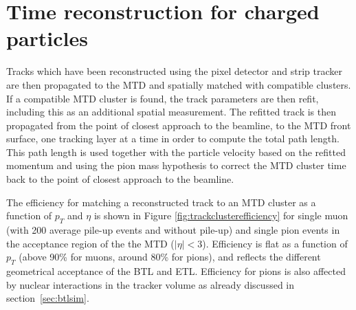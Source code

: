 \section{Time reconstruction for charged particles}

Tracks which have been reconstructed using the pixel detector and strip tracker are then propagated to the MTD and spatially matched with compatible clusters.  If a compatible MTD cluster is found, the track parameters are then refit, including this as an additional spatial measurement.  The refitted track is then propagated from the point of closest approach to the beamline, to the MTD front surface, one tracking layer at a time in order to compute the total path length.  This path length is used together with the particle velocity based on the refitted momentum and using the pion mass hypothesis to correct the MTD cluster time back to the point of closest approach to the beamline.  

The efficiency for matching a reconstructed track to an MTD cluster as a function of $p_T$ and $\eta$ is shown in Figure \ref{fig:trackclusterefficiency} for single muon (with 200 average pile-up events and without pile-up) and single pion events in the acceptance region of the the MTD ($|\eta|<3$). Efficiency is flat as a function of $p_{T}$ (above 90\% for muons, around 80\% for pions), and reflects the different geometrical acceptance of the BTL and ETL. Efficiency for pions is also affected by nuclear interactions in the tracker volume as already discussed in section~\ref{sec:btlsim}.

